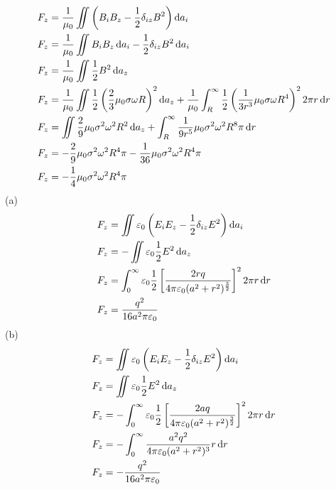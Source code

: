 \begin{align*}
    F_z&=\frac{1}{\mu_0}\iint\left(B_iB_z-\frac{1}{2}\delta_{iz}B^2\right)\dif a_i\\
    F_z&=\frac{1}{\mu_0}\iint B_iB_z\dif a_i-\frac{1}{2}\delta_{iz}B^2\dif a_i\\
    F_z&=\frac{1}{\mu_0}\iint\frac{1}{2}B^2\dif a_z\\
    F_z&=\frac{1}{\mu_0}\iint\frac{1}{2}\left(\frac{2}{3}\mu_0\sigma\omega R \right)^2\dif a_z
    +\frac{1}{\mu_0}\int_R^\infty\frac{1}{2}\left(\frac{1}{3r^3}\mu_0\sigma\omega R^4\right)^22\pi r\dif r\\
    F_z&=\iint\frac{2}{9}\mu_0\sigma^2\omega^2 R^2\dif a_z
    +\int_R^\infty\frac{1}{9r^5}\mu_0\sigma^2\omega^2 R^8\pi \dif r\\
    F_z&=-\frac{2}{9}\mu_0\sigma^2\omega^2 R^4\pi-\frac{1}{36}\mu_0\sigma^2\omega^2 R^4\pi\\
    F_z&=-\frac{1}{4}\mu_0\sigma^2\omega^2 R^4\pi
\end{align*}
(a)\begin{align*}
    F_z&=\iint\varepsilon_0\left(E_iE_z-\frac{1}{2}\delta_{iz}E^2\right)\dif a_i\\
    F_z&=-\iint\varepsilon_0\frac{1}{2}E^2\dif a_z\\
    F_z&=\int_0^\infty\varepsilon_0\frac{1}{2}\left[\frac{2rq}{4\pi \varepsilon_0(a^2+r^2)^\frac32}\right]^22\pi r\dif r\\
    F_z&=\frac{q^2}{16 a^2\pi\varepsilon_0}
\end{align*}
(b)
\begin{align*}
    F_z&=\iint\varepsilon_0\left(E_iE_z-\frac{1}{2}\delta_{iz}E^2\right)\dif a_i\\
    F_z&=\iint\varepsilon_0\frac{1}{2}E^2\dif a_z\\
    F_z&=-\int_0^\infty\varepsilon_0\frac{1}{2}\left[\frac{2aq}{4\pi\varepsilon_0(a^2+r^2)^\frac32}\right]^22\pi r\dif r\\
    F_z&=-\int_0^\infty\frac{a^2q^2}{4\pi\varepsilon_0(a^2+r^2)^3}r\dif r\\
    F_z&=-\frac{q^2}{16 a^2\pi\varepsilon_0}
\end{align*}

